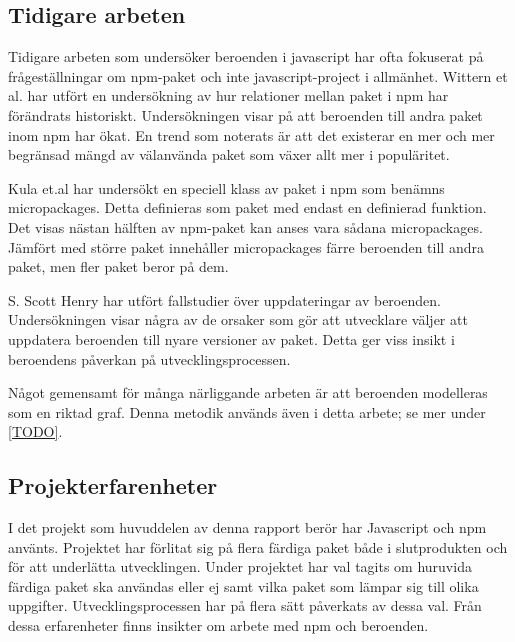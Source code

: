 \subsection{Tidigare arbeten}
Tidigare arbeten som undersöker beroenden i javascript har ofta fokuserat på frågeställningar om npm-paket och inte javascript-project i allmänhet. Wittern et al. har utfört en undersökning av hur relationer mellan paket i npm har förändrats historiskt.\cite{Wittern:2016} Undersökningen visar på att beroenden till andra paket inom npm har ökat. En trend som noterats är att det existerar en mer och mer begränsad mängd av välanvända paket som växer allt mer i populäritet.

Kula et.al har undersökt en speciell klass av paket i npm som benämns micropackages.\cite{Kula2017} Detta definieras som paket med endast en definierad funktion. Det visas nästan hälften av npm-paket kan anses vara sådana micropackages. Jämfört med större paket innehåller micropackages färre beroenden till andra paket, men fler paket beror på dem.

S. Scott Henry har utfört fallstudier över uppdateringar av beroenden.\cite{Henry2017} Undersökningen visar några av de orsaker som gör att utvecklare väljer att uppdatera beroenden till nyare versioner av paket. Detta ger viss insikt i beroendens påverkan på utvecklingsprocessen.

Något gemensamt för många närliggande arbeten är att beroenden modelleras som en riktad graf. Denna metodik används även i detta arbete; se mer under \ref{TODO}.

\subsection{Projekterfarenheter}
I det projekt som huvuddelen av denna rapport berör har Javascript och npm använts. Projektet har förlitat sig på flera färdiga paket både i slutprodukten och för att underlätta utvecklingen. Under projektet har val tagits om huruvida färdiga paket ska användas eller ej samt vilka paket som lämpar sig till olika uppgifter. Utvecklingsprocessen har på flera sätt påverkats av dessa val. Från dessa erfarenheter finns insikter om arbete med npm och beroenden.
